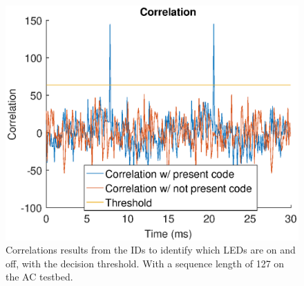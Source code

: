 \begin{figure}[t]
	\centering
	\includegraphics[angle=0,width=\textwidth,keepaspectratio]{chapters/evaluation-chapters/hardware/ac/correlation-ac-testbed.eps}
	\caption{Correlations results from the IDs to identify which LEDs are on and off, with the decision threshold. With a sequence length of 127 on the AC testbed.}
	\label{fig:correlation-ac-testbed}
\end{figure}

